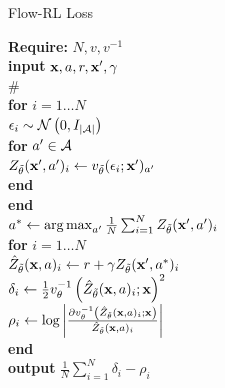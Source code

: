 \documentclass[twoside]{article}
\begin{document}
\begin{algorithm}
  \caption{Flow-RL Loss}\label{alg:LTM}
  \textbf{Require:} \(N, v, v^{-1}\)\\
  \textbf{input} \(\textbf{x}, a, r, \textbf{x}^\prime, \gamma\)\\
  \hspace*{1em} {\color{gray} \# }\\
  \hspace*{1em} \textbf{for} \(i = 1 \dots N\)\\
  \hspace*{2em} \(\epsilon_i \sim \mathcal{N} \left(0, I_{\lvert \mathcal{A} \rvert} \right)\)\\
  \hspace*{2em} \textbf{for} \(a^\prime \in \mathcal{A}\)\\
  \hspace*{3em} \(Z_{\tilde{\theta}}(\textbf{x}^\prime, a^\prime)_i \gets v_{\tilde{\theta}}(\epsilon_i; \textbf{x}^\prime)_{a^\prime}\)\\
  \hspace*{2em} \textbf{end}\\
  \hspace*{1em} \textbf{end}\\
  \hspace*{1em} \(a^* \gets \operatorname*{arg\,max}_{a^\prime} \frac{1}{N} \sum_{i=1}^N Z_{\tilde{\theta}}(\textbf{x}^\prime, a^\prime)_i\)\\
  \hspace*{1em} \textbf{for} \(i = 1 \dots N\)\\
  \hspace*{2em} \(\hat{Z}_{\tilde{\theta}}(\textbf{x}, a)_i \gets r + \gamma Z_{\tilde{\theta}}(\textbf{x}^\prime, a^*)_i\)\\
  \hspace*{2em} \(\delta_i \gets \frac{1}{2} v_{\theta}^{-1} 
  \left(\hat{Z}_{\tilde{\theta}}(\textbf{x}, a)_i; \textbf{x} \right)^2\)\\
  \hspace*{2em} \(\rho_i \gets \log \left\lvert \frac{\partial v_{\theta}^{-1} \left(\hat{Z}_{\tilde{\theta}}(\textbf{x}, a)_i; \textbf{x} \right)}{\hat{Z}_{\tilde{\theta}}(\textbf{x}, a)_i} \right\rvert\)\\
  \hspace*{1em} \textbf{end}\\
  \textbf{output} \(\frac{1}{N}\sum_{i=1}^N \delta_i - \rho_i\)
\end{algorithm}

\end{document}
